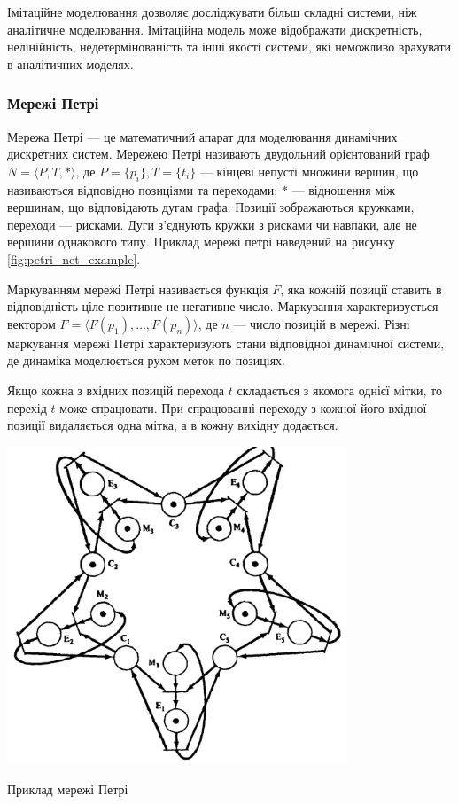 Імітаційне моделювання дозволяє досліджувати більш складні системи, ніж аналітичне моделювання. Імітаційна модель може відображати дискретність, нелінійність, недетермінованість та інші якості системи, які неможливо врахувати в аналітичних моделях. 

\subsubsection{Мережі Петрі}
Мережа Петрі --- це математичний апарат для моделювання динамічних дискретних систем. Мережею Петрі називають двудольний орієнтований граф \mbox {$ N = \langle P, T, * \rangle $}, де \mbox{$ P = \{p_i\}, T = \{t_i\} $} --- кінцеві непусті множини вершин, що називаються відповідно позиціями та переходами; $*$ --- відношення між вершинам, що відповідають дугам графа. Позиції зображаються кружками, переходи --- рисками. Дуги з’єднують кружки з рисками чи навпаки, але не вершини однакового типу. Приклад мережі петрі наведений на рисунку \ref{fig:petri_net_example}.

Маркуванням мережі Петрі називається функція $F$, яка кожній позиції ставить в відповідність ціле позитивне не негативне число. Маркування характеризується вектором \mbox{$ F = \langle F(p_1), \dots, F(p_n) \rangle $}, де $n$ --- число позицій в мережі.
Різні маркування мережі Петрі характеризують стани відповідної динамічної системи, де динаміка моделюється рухом меток по позиціях.

Якщо кожна з вхідних позицій перехода $t$ складається з якомога однієї мітки, то перехід $t$ може спрацювати. При спрацюванні переходу з кожної його вхідної позиції видаляється одна мітка, а в кожну вихідну додається.
            \begin{stdfigure}
                \includegraphics[width=4in]{images/petri_net_example.png}
                \caption{Приклад мережі Петрі}
                \label{fig:petri_net_example}
            \end{stdfigure}   

